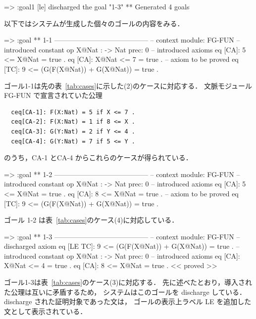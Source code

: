 \documentclass[a4paper,oneside,10pt,here]{memoir}
\newenvironment{vvtm}%
{\parskip=0pt\lineskip=0pt\begin{center}\begin{minipage}{0.8\textwidth}\begin{snugshade}}%
  {\end{snugshade}\end{minipage}\end{center}}
\begin{document}
\begin{vvtm}
\begin{simplev}
[ca]=> :goal{1}
[le] discharged the goal "1-3"
** Generated 4 goals
\end{simplev}
\end{vvtm}

以下ではシステムが生成した個々のゴールの内容をみる．

\begin{vvtm}
\begin{simplev}
[ca]=>
:goal { ** 1-1 -----------------------------------------
  -- context module: FG-FUN
  -- introduced constant
    op X@Nat : -> Nat { prec: 0 }
  -- introduced axioms
    eq [CA]: 5 <= X@Nat = true .
    eq [CA]: X@Nat <= 7 = true .
  -- axiom to be proved
    eq [TC]: 9 <= (G(F(X@Nat)) + G(X@Nat))
        = true .
}
\end{simplev}
\end{vvtm}
ゴール1-1は先の表~\ref{tab:cases}に示した(2)のケースに対応する．
文脈モジュール FG-FUN で宣言されていた公理
\begin{verbatim}
  ceq[CA-1]: F(X:Nat) = 5 if X <= 7 .
  ceq[CA-2]: F(X:Nat) = 1 if 8 <= X .
  ceq[CA-3]: G(Y:Nat) = 2 if Y <= 4 .
  ceq[CA-4]: G(Y:Nat) = 7 if 5 <= Y .
\end{verbatim}
のうち，CA-1 とCA-4 からこれらのケースが得られている．

\begin{vvtm}
\begin{simplev}
[ca]=>
:goal { ** 1-2 -----------------------------------------
  -- context module: FG-FUN
  -- introduced constant
    op X@Nat : -> Nat { prec: 0 }
  -- introduced axioms
    eq [CA]: 5 <= X@Nat = true .
    eq [CA]: 8 <= X@Nat = true .
  -- axiom to be proved
    eq [TC]: 9 <= (G(F(X@Nat)) + G(X@Nat))
        = true .
}
\end{simplev}
\end{vvtm}
ゴール 1-2 は表~\ref{tab:cases}のケース(4)に対応している．

\begin{vvtm}
\begin{simplev}
[ca]=>
:goal { ** 1-3 -----------------------------------------
  -- context module: FG-FUN
  -- discharged axiom
    eq [LE TC]: 9 <= (G(F(X@Nat)) + G(X@Nat))
        = true .
  -- introduced constant
    op X@Nat : -> Nat { prec: 0 }
  -- introduced axioms
    eq [CA]: X@Nat <= 4 = true .
    eq [CA]: 8 <= X@Nat = true .
} << proved >>
\end{simplev}
\end{vvtm}
ゴール1-3は表~\ref{tab:cases}のケース(3)に対応する．
先に述べたとおり，導入された公理は互いに矛盾するため，
システムはこのゴールを discharge している．
discharge された証明対象であった文は，
ゴールの表示上ラベル LE を追加した文として表示されている．
\end{document}
